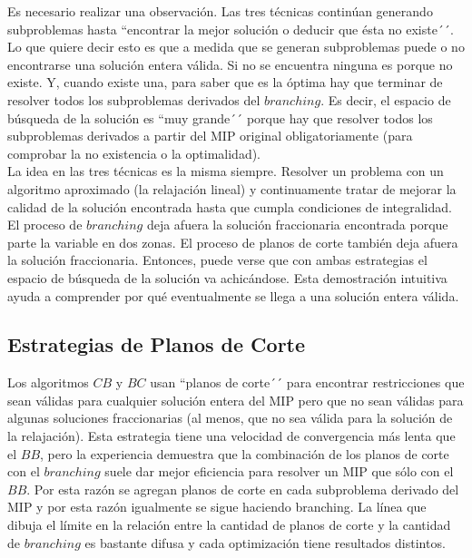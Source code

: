 Es necesario realizar una observación. Las tres técnicas continúan generando subproblemas hasta ``encontrar la mejor solución o deducir que ésta no existe´´. Lo que quiere decir esto es que a medida que se generan subproblemas puede o no encontrarse una solución entera válida. Si no se encuentra ninguna es porque no existe. Y, cuando existe una, para saber que es la óptima hay que terminar de resolver todos los subproblemas derivados del $branching$. Es decir, el espacio de búsqueda de la solución es ``muy grande´´ porque hay que resolver todos los subproblemas derivados a partir del MIP original obligatoriamente (para comprobar la no existencia o la optimalidad).\\

La idea en las tres técnicas es la misma siempre. Resolver un problema con un algoritmo aproximado (la relajación lineal) y continuamente tratar de mejorar la calidad de la solución encontrada hasta que cumpla condiciones de integralidad. El proceso de $branching$ deja afuera la solución fraccionaria encontrada porque parte la variable en dos zonas. El proceso de planos de corte también deja afuera la solución fraccionaria. Entonces, puede verse que con ambas estrategias el espacio de búsqueda de la solución va achicándose. Esta demostración intuitiva ayuda a comprender por qué eventualmente se llega a una solución entera válida.

\newpage

\subsection{Estrategias de Planos de Corte}

Los algoritmos $CB$ y $BC$ usan ``planos de corte´´ para encontrar restricciones que sean válidas para cualquier solución entera del MIP pero que no sean válidas para algunas soluciones fraccionarias (al menos, que no sea válida para la solución de la relajación). Esta estrategia tiene una velocidad de convergencia más lenta que el $BB$, pero la experiencia demuestra que la combinación de los planos de corte con el $branching$ suele dar mejor eficiencia para resolver un MIP que sólo con el $BB$. Por esta razón se agregan planos de corte en cada subproblema derivado del MIP y por esta razón igualmente se sigue haciendo branching. La línea que dibuja el límite en la relación entre la cantidad de planos de corte y la cantidad de $branching$ es bastante difusa y cada optimización tiene resultados distintos.\\

